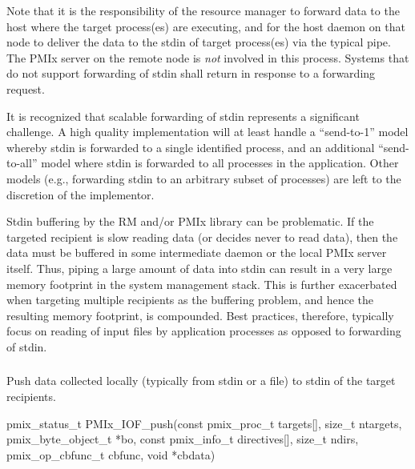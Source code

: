 Note that it is the responsibility of the resource manager to forward data to the host where the target process(es) are executing, and for the host daemon on that node to deliver the data to the stdin of target process(es) via the typical pipe. The \ac{PMIx} server on the remote node is \emph{not} involved in this process. Systems that do not support forwarding of stdin shall return  in response to a forwarding request.

\adviceimplstart
It is recognized that scalable forwarding of stdin represents a significant challenge. A high quality implementation will at least handle a ``send-to-1'' model whereby stdin is forwarded to a single identified process, and an additional ``send-to-all'' model where stdin is forwarded to all processes in the application. Other models (e.g., forwarding stdin to an arbitrary subset of processes) are left to the discretion of the implementor.
\adviceimplend

\adviceuserstart
Stdin buffering by the \ac{RM} and/or \ac{PMIx} library can be problematic. If the targeted recipient is slow reading data (or decides never to read data), then the data must be buffered in some intermediate daemon or the local \ac{PMIx} server itself. Thus, piping a large amount of data into stdin can result in a very large memory footprint in the system management stack. This is further exacerbated when targeting multiple recipients as the buffering problem, and hence the resulting memory footprint, is compounded. Best practices, therefore, typically focus on reading of input files by application processes as opposed to forwarding of stdin.
\adviceuserend

\subsubsection{}

\summary

Push data collected locally (typically from stdin or a file) to stdin of the target recipients.

\format

\cspecificstart
\begin{codepar}
pmix_status_t
PMIx_IOF_push(const pmix_proc_t targets[], size_t ntargets,
              pmix_byte_object_t *bo,
              const pmix_info_t directives[], size_t ndirs,
              pmix_op_cbfunc_t cbfunc, void *cbdata)
\end{codepar}
\cspecificend

